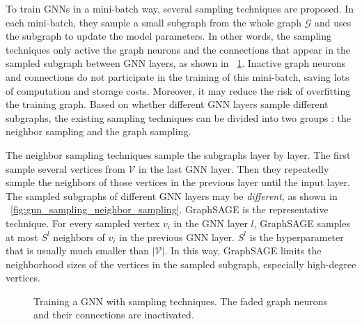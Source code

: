 To train GNNs in a mini-batch way, several sampling techniques are proposed.
In each mini-batch, they sample a small subgraph from the whole graph $\mathcal{G}$ and uses the subgraph to update the model parameters.
In other words, the sampling techniques only active the graph neurons and the connections that appear in the sampled subgraph between GNN layers, as shown in \figurename~\ref{fig:gnn_sampling}.
Inactive graph neurons and connections do not participate in the training of this mini-batch, saving lots of computation and storage costs.
Moreover, it may reduce the risk of overfitting the training graph.
Based on whether different GNN layers sample different subgraphs, the existing sampling techniques can be divided into two groups \cite{zeng2020_graphsaint}: the neighbor sampling and the graph sampling.

The neighbor sampling techniques \cite{hamilton2017_graphsage, ying2018_pinsage, chen2018_fastgcn, chen2018_sgcn, huang2018_adap} sample the subgraphs layer by layer.
The first sample several vertices from $\mathcal{V}$ in the last GNN layer.
Then they repeatedly sample the neighbors of those vertices in the previous layer until the input layer.
The sampled subgraphs of different GNN layers may be \emph{different}, as shown in \figurename~\ref{fig:gnn_sampling_neighbor_sampling}.
GraphSAGE \cite{hamilton2017_graphsage} is the representative technique.
For every sampled vertex $v_i$ in the GNN layer $l$, GraphSAGE samples at most $S^l$ neighbors of $v_i$ in the previous GNN layer.
$S^l$ is the hyperparameter that is usually much smaller than $|\mathcal{V}|$.
In this way, GraphSAGE limits the neighborhood sizes of the vertices in the sampled subgraph, especially high-degree vertices.

\begin{figure}
    \centering
    \caption{Training a GNN with sampling techniques. The faded graph neurons and their connections are inactivated.}
    \label{fig:gnn_sampling}
\end{figure}


